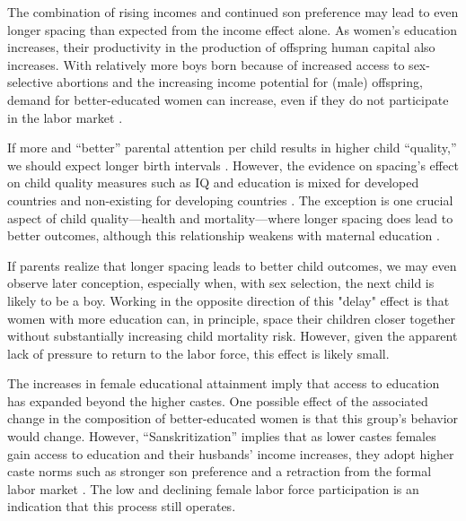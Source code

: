 \documentclass[12pt,letterpaper]{article}
\begin{document}
The combination of rising incomes and continued son preference may lead to even longer 
spacing than expected from the income effect alone.
As women's education increases, their productivity in the production of offspring human 
capital also increases.
With relatively more boys born because of increased access to sex-selective 
abortions and the increasing income potential for (male) offspring, demand for 
better-educated women can increase, even if they do not participate in the labor market 
\citep{Behrman1999}.

If more and ``better'' parental attention per child results in higher child ``quality,'' 
we should expect longer birth intervals \citep{Zajonc1975,Zajonc1976,Razin1980}.
However, the evidence on spacing's effect on child quality measures such as IQ 
and education is mixed for developed countries and non-existing for developing countries
\citep{Powell1993,Pettersson-Lidbom2009,Buckles2012,Barclay2017}.
The exception is one crucial aspect of child quality---health and mortality---where
longer spacing does lead to better outcomes, although this relationship weakens with 
maternal education \citep{Whitworth2002,Conde-Agudelo2012,Molitoris2019}.

If parents realize that longer spacing leads to better child outcomes, we may even observe 
later conception, especially when, with sex selection, the next child is likely to be a boy.
Working in the opposite direction of this "delay" effect is that women with more education 
can, in principle, space their children closer together without substantially increasing 
child mortality risk. 
However, given the apparent lack of pressure to return to the labor force, this effect is 
likely small.


The increases in female educational attainment imply that access to education has 
expanded beyond the higher castes. 
One possible effect of the associated change in the composition of better-educated women 
is that this group's behavior would change.
However, ``Sanskritization'' implies that as lower castes females gain access to 
education and their husbands' income increases, they adopt higher caste 
norms such as stronger son preference and a retraction from the formal labor 
market \citep{Srinivas1956,Chen1995,Abraham2013,Chatterjee2018}.
The low and declining female labor force participation is an indication that this
process still operates.

\end{document}
